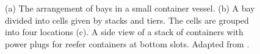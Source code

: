 \begin{figure}[tbh]
  \centering
  $\qquad$
	\\
  ~
	\qquad
  ~
  $\qquad$
\caption{(a) The arrangement of bays in a small container vessel. (b) A bay divided into cells given by stacks and tiers. The cells are grouped into four locations (c). A side view of a stack of containers with power plugs for reefer containers at bottom slots. {Adapted from \cite{AlbertosThesis}.}}
\label{fig:bay}
\end{figure}

